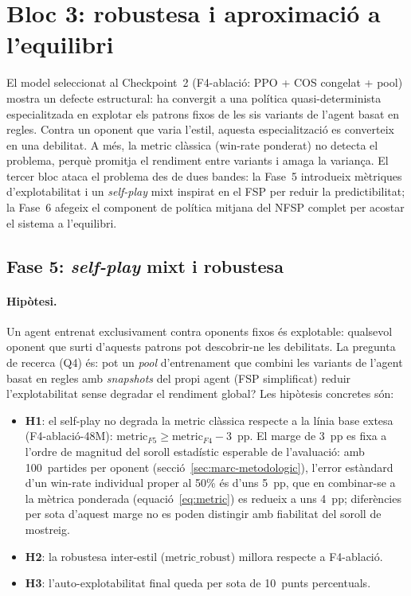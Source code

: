 ﻿%

\section{Bloc 3: robustesa i aproximació a l'equilibri}
\label{sec:bloc3}

El model seleccionat al Checkpoint~2 (F4-ablació: PPO + COS congelat + pool) mostra un
defecte estructural: ha convergit a una política quasi-determinista especialitzada en
explotar els patrons fixos de les sis variants de l'agent basat en regles. Contra un oponent
que varia l'estil, aquesta especialització es converteix en una debilitat. A més, la
\(\text{metric}\) clàssica (win-rate ponderat) no detecta el problema, perquè promitja el
rendiment entre variants i amaga la variança. El tercer bloc ataca el problema des de dues
bandes: la Fase~5 introdueix mètriques d'explotabilitat i un \emph{self-play} mixt
inspirat en el \acf{FSP} per reduir la predictibilitat; la Fase~6 afegeix el
component de política mitjana del \ac{NFSP} complet per acostar el sistema a l'equilibri.

\subsection{Fase 5: \emph{self-play} mixt i robustesa}
\label{sec:fase5}

\paragraph{Hipòtesi.} Un agent entrenat exclusivament contra oponents fixos és explotable:
qualsevol oponent que surti d'aquests patrons pot descobrir-ne les debilitats. La
pregunta de recerca (Q4) és: pot un \emph{pool} d'entrenament que combini les variants
de l'agent basat en regles amb \emph{snapshots} del propi agent (\ac{FSP}
simplificat) reduir l'explotabilitat sense degradar el rendiment global? Les hipòtesis
concretes són:
\begin{itemize}
  \item \textbf{H1}: el self-play no degrada la \(\text{metric}\) clàssica respecte a la
        línia base extesa (F4-ablació-48M): \(\text{metric}_{F5} \geq \text{metric}_{F4} - 3\)~pp.
        El marge de 3~pp es fixa a l'ordre de magnitud del soroll estadístic esperable de
        l'avaluació: amb 100~partides per oponent (secció~\ref{sec:marc-metodologic}),
        l'error estàndard d'un win-rate individual proper al 50\% és d'uns 5~pp, que en
        combinar-se a la mètrica ponderada (equació~\ref{eq:metric}) es redueix a uns
        4~pp; diferències per sota d'aquest marge no es poden distingir amb fiabilitat del
        soroll de mostreig.
  \item \textbf{H2}: la robustesa inter-estil (\(\text{metric\_robust}\)) millora
        respecte a F4-ablació.
  \item \textbf{H3}: l'auto-explotabilitat final queda per sota de 10~punts percentuals.
\end{itemize}

